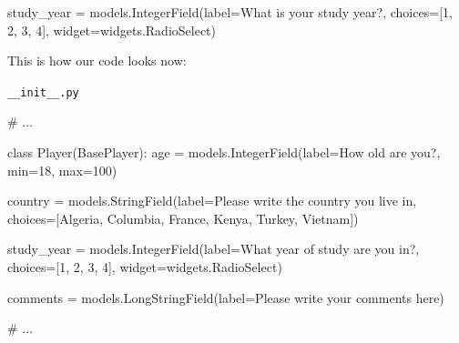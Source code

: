 \documentclass[
  letterpaper,
  DIV=11,
  numbers=noendperiod]{scrreprt}
\newenvironment{Shaded}{\begin{snugshade}}{\end{snugshade}}
\newcommand{\BuiltInTok}[1]{\textcolor[rgb]{0.00,0.23,0.31}{#1}}
\newcommand{\CommentTok}[1]{\textcolor[rgb]{0.37,0.37,0.37}{#1}}
\newcommand{\DecValTok}[1]{\textcolor[rgb]{0.68,0.00,0.00}{#1}}
\newcommand{\KeywordTok}[1]{\textcolor[rgb]{0.00,0.23,0.31}{#1}}
\newcommand{\NormalTok}[1]{\textcolor[rgb]{0.00,0.23,0.31}{#1}}
\newcommand{\OperatorTok}[1]{\textcolor[rgb]{0.37,0.37,0.37}{#1}}
\newcommand{\StringTok}[1]{\textcolor[rgb]{0.13,0.47,0.30}{#1}}
\begin{document}
\begin{Shaded}
\begin{Highlighting}[]
\NormalTok{study\_year }\OperatorTok{=}\NormalTok{ models.IntegerField(label}\OperatorTok{=}\StringTok{\textquotesingle{}What is your study year?\textquotesingle{}}\NormalTok{,}
\NormalTok{                                 choices}\OperatorTok{=}\NormalTok{[}\DecValTok{1}\NormalTok{, }\DecValTok{2}\NormalTok{, }\DecValTok{3}\NormalTok{, }\DecValTok{4}\NormalTok{],}
\NormalTok{                                 widget}\OperatorTok{=}\NormalTok{widgets.RadioSelect)}
\end{Highlighting}
\end{Shaded}

This is how our code looks now:

\begin{codelisting}

\caption{\texttt{__init__.py}}

\begin{Shaded}
\begin{Highlighting}[]
\CommentTok{\# ...}

\KeywordTok{class}\NormalTok{ Player(BasePlayer):}
\NormalTok{    age }\OperatorTok{=}\NormalTok{ models.IntegerField(label}\OperatorTok{=}\StringTok{\textquotesingle{}How old are you?\textquotesingle{}}\NormalTok{, }\BuiltInTok{min}\OperatorTok{=}\DecValTok{18}\NormalTok{, }\BuiltInTok{max}\OperatorTok{=}\DecValTok{100}\NormalTok{)}
    
\NormalTok{    country }\OperatorTok{=}\NormalTok{ models.StringField(label}\OperatorTok{=}\StringTok{\textquotesingle{}Please write the country you live in\textquotesingle{}}\NormalTok{,}
\NormalTok{                            choices}\OperatorTok{=}\NormalTok{[}\StringTok{\textquotesingle{}Algeria\textquotesingle{}}\NormalTok{, }\StringTok{\textquotesingle{}Columbia\textquotesingle{}}\NormalTok{, }\StringTok{\textquotesingle{}France\textquotesingle{}}\NormalTok{, }\StringTok{\textquotesingle{}Kenya\textquotesingle{}}\NormalTok{, }\StringTok{\textquotesingle{}Turkey\textquotesingle{}}\NormalTok{, }\StringTok{\textquotesingle{}Vietnam\textquotesingle{}}\NormalTok{])}
    
\NormalTok{    study\_year }\OperatorTok{=}\NormalTok{ models.IntegerField(label}\OperatorTok{=}\StringTok{\textquotesingle{}What year of study are you in?\textquotesingle{}}\NormalTok{,}
\NormalTok{                                 choices}\OperatorTok{=}\NormalTok{[}\DecValTok{1}\NormalTok{, }\DecValTok{2}\NormalTok{, }\DecValTok{3}\NormalTok{, }\DecValTok{4}\NormalTok{],}
\NormalTok{                                 widget}\OperatorTok{=}\NormalTok{widgets.RadioSelect)    }
    
\NormalTok{    comments }\OperatorTok{=}\NormalTok{ models.LongStringField(label}\OperatorTok{=}\StringTok{\textquotesingle{}Please write your comments here\textquotesingle{}}\NormalTok{)}

\CommentTok{\# ...}
\end{Highlighting}
\end{Shaded}

\end{codelisting}
\end{document}
